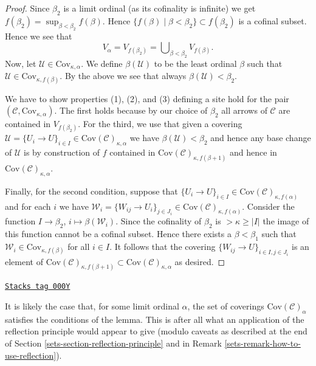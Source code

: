 \begin{proof}
\medskip\noindent
Since $\beta_2$ is a limit ordinal (as its cofinality is infinite)
we get $f(\beta_2) = \sup_{\beta < \beta_2} f(\beta)$.
Hence $\{f(\beta) \mid \beta < \beta_2\} \subset f(\beta_2)$ is a
cofinal subset. Hence we see that
$$
V_\alpha = V_{f(\beta_2)} = \bigcup\nolimits_{\beta < \beta_2} V_{f(\beta)}.
$$
Now, let $\mathcal{U} \in \text{Cov}_{\kappa, \alpha}$.
We define $\beta(\mathcal{U})$ to be the least ordinal $\beta$ such that
$\mathcal{U} \in \text{Cov}_{\kappa, f(\beta)}$. By the above we see
that always $\beta(\mathcal{U}) < \beta_2$.

\medskip\noindent
We have to show properties (1), (2), and (3) defining a site
hold for the pair $(\mathcal{C}, \text{Cov}_{\kappa, \alpha})$.
The first holds because by our choice of $\beta_2$
all arrows of $\mathcal{C}$ are contained in $V_{f(\beta_2)}$.
For the third, we use that given a covering
$\mathcal{U} = \{U_i \to U\}_{i \in I}
\in \text{Cov}(\mathcal{C})_{\kappa, \alpha}$
we have $\beta(\mathcal{U}) < \beta_2$ and hence
any base change of $\mathcal{U}$ is by construction of
$f$ contained in $\text{Cov}(\mathcal{C})_{\kappa, f(\beta + 1)}$
and hence in $\text{Cov}(\mathcal{C})_{\kappa, \alpha}$.

\medskip\noindent
Finally, for the second condition, suppose that $\{U_i \to U\}_{i\in I}
\in \text{Cov}(\mathcal{C})_{\kappa, f(\alpha)}$
and for each $i$ we have
$\mathcal{W}_i = \{W_{ij} \to U_i\}_{j\in J_i}
\in \text{Cov}(\mathcal{C})_{\kappa, f(\alpha)}$.
Consider the function
$I \to \beta_2$, $i \mapsto \beta(\mathcal{W}_i)$. Since the cofinality
of $\beta_2$ is $> \kappa \geq |I|$ the image of this function cannot be a
cofinal subset. Hence there exists a $\beta < \beta_1$ such
that $\mathcal{W}_i \in \text{Cov}_{\kappa, f(\beta)}$ for all $i \in I$.
It follows that the covering $\{W_{ij} \to U\}_{i\in I, j \in J_i}$
is an element of $\text{Cov}(\mathcal{C})_{\kappa, f(\beta + 1)}
\subset \text{Cov}(\mathcal{C})_{\kappa, \alpha}$ as desired.
\end{proof}

\begin{remark}[Better]
\label{sets-remark-better}
\href{https://stacks.math.columbia.edu/tag/000Y}{\texttt{Stacks tag 000Y}}

It is likely the case that, for some limit ordinal $\alpha$,
the set of coverings $\text{Cov}(\mathcal{C})_\alpha$ satisfies
the conditions of the lemma. This is after all what an application
of the reflection principle would appear to give (modulo caveats as
described at the end of Section \ref{sets-section-reflection-principle}
and in Remark \ref{sets-remark-how-to-use-reflection}).
\end{remark}

